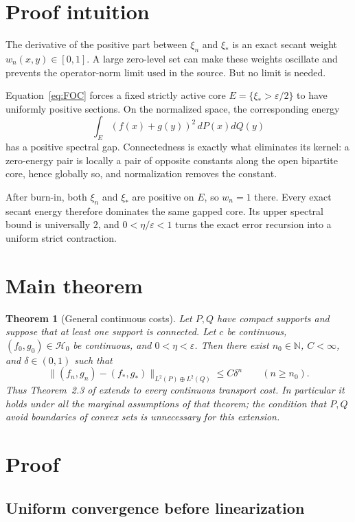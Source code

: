 \documentclass[11pt]{article}
\newtheorem{theorem}{Theorem}
\newcommand{\cH}{\mathcal{H}}
\newcommand{\eps}{\varepsilon}
\newcommand{\1}{\mathbf{1}}
\begin{document}
\section{Proof intuition}

The derivative of the positive part between $\xi_n$ and $\xi_*$ is an exact
secant weight $w_n(x,y)\in[0,1]$.  A large zero-level set can make these
weights oscillate and prevents the operator-norm limit used in the source.
But no limit is needed.

Equation~\eqref{eq:FOC} forces a fixed strictly active core
$E=\{\xi_*>\eps/2\}$ to have uniformly positive sections.  On the normalized
space, the corresponding energy
\[
 \int_E(f(x)+g(y))^2\,dP(x)dQ(y)
\]
has a positive spectral gap.  Connectedness is exactly what eliminates its
kernel: a zero-energy pair is locally a pair of opposite constants along the
open bipartite core, hence globally so, and normalization removes the
constant.

After burn-in, both $\xi_n$ and $\xi_*$ are positive on $E$, so $w_n=1$ there.
Every exact secant energy therefore dominates the same gapped core.  Its upper
spectral bound is universally $2$, and $0<\eta/\eps<1$ turns the exact error
recursion into a uniform strict contraction.

\section{Main theorem}

\begin{theorem}[General continuous costs]
\label{thm:main}
Let $P,Q$ have compact supports and suppose that at least one support is
connected.  Let $c$ be continuous, $(f_0,g_0)\in\cH_0$ be continuous, and
$0<\eta<\eps$.  Then there exist $n_0\in\mathbb N$, $C<\infty$, and
$\delta\in(0,1)$ such that
\[
 \|(f_n,g_n)-(f_*,g_*)\|_{L^2(P)\oplus L^2(Q)}
 \le C\delta^n\qquad(n\ge n_0).
\]
Thus Theorem~2.3 of \cite{GNR2026} extends to every continuous transport cost.
In particular it holds under all the marginal assumptions of that theorem;
the condition that $P,Q$ avoid boundaries of convex sets is unnecessary for
this extension.
\end{theorem}

\section{Proof}

\subsection{Uniform convergence before linearization}
\end{document}
